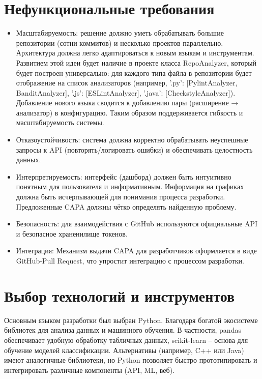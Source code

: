 \section{Нефункциональные требования} \label{ch2:problem_formulation}

\begin{itemize}
	\item Масштабируемость: решение должно уметь обрабатывать большие репозитории (сотни коммитов) и несколько проектов параллельно. Архитектура должна легко адаптироваться к новым языкам и инструментам. Развитием этой идеи будет наличие в проекте класса RepoAnalyzer, который будет построен универсально: для каждого типа файла в репозитории будет отображение на список анализаторов (например, {'.py': [PylintAnalyzer, BanditAnalyzer], '.js': [ESLintAnalyzer], '.java': [CheckstyleAnalyzer]}). Добавление нового языка сводится к добавлению пары (расширение → анализатор) в конфигурацию. Таким образом поддерживается гибкость и масштабируемость системы.
	\item  Отказоустойчивость: система должна корректно обрабатывать неуспешные запросы к API (повторять/логировать ошибки) и обеспечивать целостность данных.
	\item Интерпретируемость: интерфейс (дашборд) должен быть интуитивно понятным для пользователя и информативным. Информация на графиках должна быть исчерпывающей для понимания процесса разработки. Предложенные CAPA должны чётко определять найденную проблему.
	\item Безопасность: для взаимодействия с GitHub используются официальные API и безопасное храненилище токенов. 
	\item Интеграция: Механизм выдачи CAPA для разработчиков оформляется в виде GitHub-Pull Request, что упростит интеграцию с процессом разработки.
\end{itemize}

\section{Выбор технологий и инструментов} \label{ch2:algorithm_selection}

Основным языком разработки был выбран Python. Благодаря богатой экосистеме библиотек для анализа данных и машинного обучения. В частности, pandas обеспечивает удобную обработку табличных данных, scikit-learn – основа для обучение моделей классификации. Альтернативы (например, C++ или Java) имеют аналогичные библиотеки, но Python позволяет быстро прототипировать и интегрировать различные компоненты (API, ML, веб).

